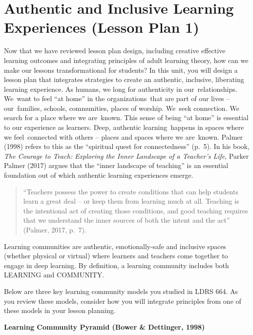 \documentclass[
]{book}
\begin{document}
\hypertarget{authentic-and-inclusive-learning-experiences-lesson-plan-1}{%
\section{Authentic and Inclusive Learning Experiences (Lesson Plan 1)}\label{authentic-and-inclusive-learning-experiences-lesson-plan-1}}

Now that we have reviewed lesson plan design, including creative effective learning outcomes and integrating principles of adult learning theory, how can we make our lessons transformational for students? In this unit, you will design a lesson plan that integrates strategies to create an authentic, inclusive, liberating learning experience.
As humans, we long for authenticity in our~relationships. We~want to feel ``at home'' in the organizations~that are part of our lives -- our~families, schools, communities, places of worship. We~seek connection. We search for a place where we are~known.
This sense of being ``at home'' is essential to our experience as learners. Deep, authentic learning~happens in spaces where we feel~connected with others -- places and spaces where we are~known. Palmer (1998) refers to this as the ``spiritual quest for connectedness'' (p.~5).
In his book, \emph{The Courage to Teach: Exploring the Inner Landscape of a Teacher's Life}, Parker Palmer (2017) argues that the ``inner landscape of teaching'' is an essential foundation out of which authentic learning experiences emerge.

\begin{quote}
``Teachers possess the power to create conditions that can help students learn a great deal -- or keep them from learning much at all. Teaching is the intentional act of creating those conditions, and good teaching requires that we understand the inner sources of both the intent and the act'' (Palmer, 2017, p.~7).
\end{quote}

Learning communities are authentic, emotionally-safe and inclusive spaces (whether physical or virtual) where learners and teachers come together to engage in deep learning. By definition, a learning community includes both LEARNING and COMMUNITY.

Below are three key learning community models you studied in LDRS 664. As you review these models, consider how you will integrate principles from one of these models in your lesson planning.

\textbf{Learning Community Pyramid (Bower \& Dettinger, 1998)}
\end{document}

